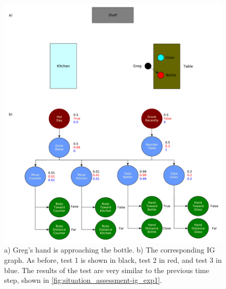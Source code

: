 \clearpage

\hfill
 \begin{figure}[ht!]
	\centering
	\includegraphics[scale=0.4]{img/situation_assessment/ig_exp2.pdf}
	\caption[IG Example 2]{a) Greg's hand is approaching the bottle. b) The corresponding IG graph. As before, test 1 is shown in black, test 2 in red, and test 3 in blue. The results of 
	the test are very similar to the previous time step, shown in \ref{fig:situation_assessment-ig_exp1}.}
	\label{fig:situation_assessment-ig_exp2}
\end{figure}


